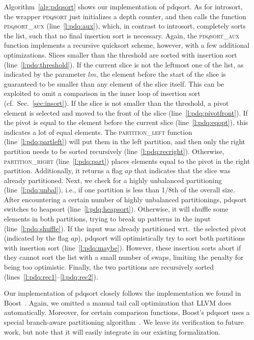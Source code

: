 \documentclass[runningheads]{llncs}
\begin{document}
  Algorithm~\ref{alg:pdqsort} shows our implementation of pdqsort.
  As for introsort, the wrapper \textsc{pdqsort} just initializes a depth counter, and then calls the function \textsc{pdqsort\_aux}
  (line~\ref{l:pdq:aux}),
  which, in contrast to introsort, completely sorts the list, such that no final insertion sort is necessary.
  Again, the \textsc{pdqsort\_aux} function implements a recursive quicksort scheme, however, with a few additional optimizations.
  Slices smaller than the threshold are sorted with insertion sort (line~\ref{l:pdq:threshold}). If the current slice is not the leftmost one
  of the list, as indicated by the parameter $lm$,
  the element before the start of the slice is guaranteed to be smaller than any element of the slice itself. This can be exploited to omit a comparison
  in the inner loop of insertion sort (cf.~Sec.~\ref{sec:insort}).
  If the slice is not smaller than the threshold, a pivot element is selected and moved to the front of the slice (line~\ref{l:pdq:pivotfront}).
  If the pivot is equal to the element before the current slice (line~\ref{l:pdq:eqopt}), this indicates a lot of equal elements.
  The \textsc{partition\_left} function (line~\ref{l:pdq:partleft}) will put them in the left partition, and then only the right partition needs
  to be sorted recursively (line~\ref{l:pdq:recright}).
  Otherwise, \textsc{partition\_right} (line~\ref{l:pdq:part}) places elements equal to the pivot in the right partition.
  Additionally, it returns a flag $ap$ that indicates that the slice was already partitioned.
  Next, we check for a highly unbalanced partitioning (line~\ref{l:pdq:unbal}), i.e., if one partition is less than 1/8th of the overall size.
  After encountering a certain number of highly unbalanced partitionings, pdqsort switches to heapsort (line~\ref{l:pdq:heapsort}).
  Otherwise, it will shuffle some elements in both partitions, trying to break up patterns in the input (line~\ref{l:pdq:shuffle}).
  If the input was already partitioned wrt.\ the selected pivot (indicated by the flag $ap$),
  pdqsort will optimistically try to sort both partitions with insertion sort (line~\ref{l:pdq:maybe}).
  However, these insertion sorts abort if they cannot sort the list with a small number of swaps, limiting the penalty for being too optimistic.
  Finally, the two partitions are recursively sorted (lines~\ref{l:pdq:rec1}--\ref{l:pdq:rec2}).

  Our implementation of pdqsort closely follows the implementation we found in Boost~\cite{boost}.
  Again, we omitted a manual tail call optimization that LLVM does automatically.
  Moreover, for certain comparison functions, Boost's pdqsort uses a special branch-aware partitioning algorithm~\cite{EdWe16}.
  We leave its verification to future work, but note that it will easily integrate in our existing formalization.
\end{document}
